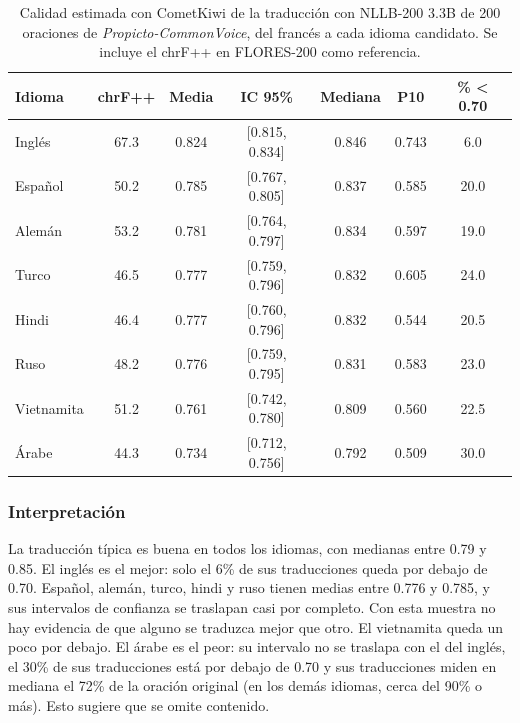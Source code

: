 \begin{table}[H]
    \centering
    \small
    \caption{Calidad estimada con CometKiwi de la traducción con NLLB-200 3.3B de 200 oraciones de \textit{Propicto-CommonVoice}, del francés a cada idioma candidato. Se incluye el chrF++ en FLORES-200 como referencia.}
    \label{tab:piloto_cometkiwi}
    \begin{tabular}{lcccccc}
        \toprule
        \textbf{Idioma} & \textbf{chrF++} & \textbf{Media} & \textbf{IC 95\%} & \textbf{Mediana} & \textbf{P10} & \textbf{\% < 0.70} \\
        \midrule
        Inglés     & 67.3 & 0.824 & [0.815, 0.834] & 0.846 & 0.743 & 6.0 \\
        Español    & 50.2 & 0.785 & [0.767, 0.805] & 0.837 & 0.585 & 20.0 \\
        Alemán     & 53.2 & 0.781 & [0.764, 0.797] & 0.834 & 0.597 & 19.0 \\
        Turco      & 46.5 & 0.777 & [0.759, 0.796] & 0.832 & 0.605 & 24.0 \\
        Hindi      & 46.4 & 0.777 & [0.760, 0.796] & 0.832 & 0.544 & 20.5 \\
        Ruso       & 48.2 & 0.776 & [0.759, 0.795] & 0.831 & 0.583 & 23.0 \\
        Vietnamita & 51.2 & 0.761 & [0.742, 0.780] & 0.809 & 0.560 & 22.5 \\
        Árabe      & 44.3 & 0.734 & [0.712, 0.756] & 0.792 & 0.509 & 30.0 \\
        \bottomrule
    \end{tabular}
\end{table}

\subsubsection{Interpretación}
La traducción típica es buena en todos los idiomas, con medianas entre 0.79 y 0.85. El inglés es el mejor: solo el 6\% de sus traducciones queda por debajo de 0.70. Español, alemán, turco, hindi y ruso tienen medias entre 0.776 y 0.785, y sus intervalos de confianza se traslapan casi por completo. Con esta muestra no hay evidencia de que alguno se traduzca mejor que otro. El vietnamita queda un poco por debajo. El árabe es el peor: su intervalo no se traslapa con el del inglés, el 30\% de sus traducciones está por debajo de 0.70 y sus traducciones miden en mediana el 72\% de la oración original (en los demás idiomas, cerca del 90\% o más). Esto sugiere que se omite contenido.


